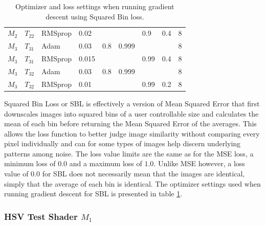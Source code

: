 \begin{table}[h]
\begin{tabular}{cclllllll}
 $M_2$     & $T_{22}$   & RMSprop    & 0.02       &            &            & 0.9        & 0.4        & 8          \\
  $M_3$     & $T_{31}$   & Adam       & 0.03       & 0.8        & 0.999      &            &            & 8          \\
 $M_3$     & $T_{31}$   & RMSprop    & 0.015      &            &            & 0.99       & 0.4        & 8          \\
 $M_3$     & $T_{32}$   & Adam       & 0.03       & 0.8        & 0.999      &            &            & 8          \\
 $M_3$     & $T_{32}$   & RMSprop    & 0.01       &            &            & 0.99       & 0.2        & 8          \\
\end{tabular}
\caption{Optimizer and loss settings when running gradient descent using Squared Bin loss.}
\label{tab:SBLOptimizerSettings}
\end{table}

Squared Bin Loss or SBL is effectively a version of Mean Squared Error that first downscales images into squared bins of a user controllable size and calculates the mean of each bin before returning the Mean Squared Error of the averages. This allows the loss function to better judge image similarity without comparing every pixel individually and can for some types of images help discern underlying patterns among noise. The loss value limits are the same as for the MSE loss, a minimum loss of $0.0$ and a maximum loss of $1.0$. Unlike MSE however, a loss value of $0.0$ for SBL does not necessarily mean that the images are identical, simply that the average of each bin is identical. The optimizer settings used when running gradient descent for SBL is presented in table \ref{tab:SBLOptimizerSettings}.

\newpage
\subsubsection{HSV Test Shader $M_1$}

